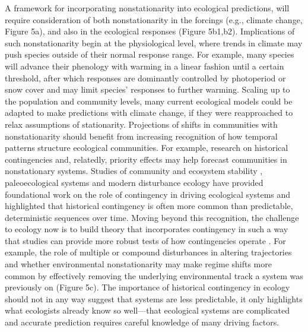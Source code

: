 \documentclass[11pt,a4paper,oneside]{article}
\begin{document}
A framework for incorporating nonstationarity into ecological predictions, will require consideration of both nonstationarity in the forcings (e.g., climate change, Figure 5a), and also in the ecological responses (Figure 5b1,b2). Implications of such nonstationarity begin at the physiological level, where trends in climate may push species outside of their normal response range. For example, many species will advance their phenology with warming in a linear fashion until a certain threshold, after which responses are dominantly controlled by photoperiod or snow cover \citep{Iler2013} and may limit species' responses to further warming. Scaling up to the population and community levels, many current ecological models could be adapted to make predictions with climate change, if they were reapproached to relax assumptions of stationarity. Projections of shifts in communities with nonstationarity should benefit from increasing recognition of how temporal patterns structure ecological communities. For example, research on historical contingencies and, relatedly, priority effects may help forecast communities in nonstationary systems. Studies of community and ecosystem stability \citep{Boettiger2013}, paleoecological systems and modern disturbance ecology have provided foundational work on the role of contingency in driving ecological systems and highlighted that historical contingency is often more common than predictable, deterministic sequences over time. Moving beyond this recognition, the challenge to ecology now is to build theory that incorporates contingency in such a way that studies can provide more robust tests of how contingencies operate \citep{vannette2014}. For example, the role of multiple or compound disturbances in altering trajectories and whether environmental nonstationarity may make regime shifts more common by effectively removing the underlying environmental track a system was previously on (Figure 5c). The importance of historical contingency in ecology should not in any way suggest that systems are less predictable, it only highlights what ecologists already know so well---that ecological systems are complicated and accurate prediction requires careful knowledge of many driving factors.\\
\end{document}
